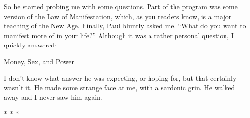 So he started probing me with some questions. Part of the program was some version of the Law of Manifestation, which, as you readers know, is a major teaching of the New Age. Finally, Paul bluntly asked me, ``What do you want to manifest more of in your life?'' Although it was a rather personal question, I quickly answered:

Money, Sex, and Power.

I don't know what answer he was expecting, or hoping for, but that certainly wasn't it. He made some strange face at me, with a sardonic grin. He walked away and I never saw him again.



\begin{center}* * *\end{center}

